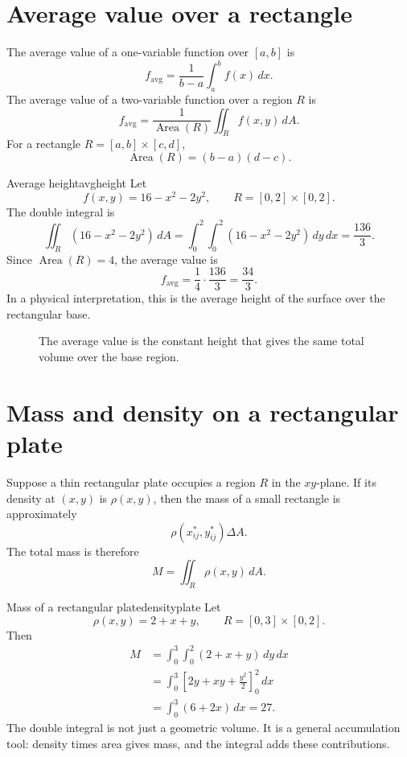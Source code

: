 \documentclass[11pt]{article}
\newcommand{\dA}{\,dA}
\newcommand{\dd}{\,d}
\newcommand{\Area}{\operatorname{Area}}
\begin{document}
\section{Average value over a rectangle}

The average value of a one-variable function over $[a,b]$ is
\[
f_{\mathrm{avg}}=\frac{1}{b-a}\int_a^b f(x)\dd x.
\]
The average value of a two-variable function over a region $R$ is
\[
f_{\mathrm{avg}}=\frac{1}{\Area(R)}\iint_R f(x,y)\dA.
\]
For a rectangle $R=[a,b]\times[c,d]$,
\[
\Area(R)=(b-a)(d-c).
\]

\begin{examplebox}{Average height}{avgheight}
Let
\[
f(x,y)=16-x^2-2y^2,\qquad R=[0,2]\times[0,2].
\]
The double integral is
\[
\iint_R(16-x^2-2y^2)\dA=\int_0^2\int_0^2(16-x^2-2y^2)\dd y\dd x=\frac{136}{3}.
\]
Since $\Area(R)=4$, the average value is
\[
f_{\mathrm{avg}}=\frac14\cdot\frac{136}{3}=\frac{34}{3}.
\]
In a physical interpretation, this is the average height of the surface over the rectangular base.
\end{examplebox}

\begin{figure}[H]
\centering
{}
\caption{The average value is the constant height that gives the same total volume over the base region.}
\end{figure}

\section{Mass and density on a rectangular plate}

Suppose a thin rectangular plate occupies a region $R$ in the $xy$-plane. If its density at $(x,y)$ is $\rho(x,y)$, then the mass of a small rectangle is approximately
\[
\rho(x_{ij}^*,y_{ij}^*)\Delta A.
\]
The total mass is therefore
\[
M=\iint_R\rho(x,y)\dA.
\]

\begin{examplebox}{Mass of a rectangular plate}{densityplate}
Let
\[
\rho(x,y)=2+x+y,\qquad R=[0,3]\times[0,2].
\]
Then
\[
\begin{aligned}
M&=\int_0^3\int_0^2(2+x+y)\dd y\dd x\\
&=\int_0^3\left[2y+xy+\frac{y^2}{2}\right]_0^2\dd x\\
&=\int_0^3(6+2x)\dd x=27.
\end{aligned}
\]
The double integral is not just a geometric volume. It is a general accumulation tool: density times area gives mass, and the integral adds these contributions.
\end{examplebox}
\end{document}
